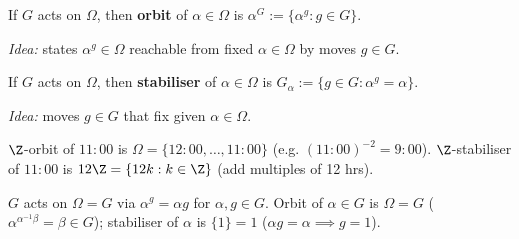 \begin{slide}
    \begin{definition}[orbit]
        \vspace{0pt}
        If $G$ acts on $\Omega$, then \textbf{orbit} of $\alpha \in \Omega$ is $\alpha^G := \{\alpha^g : g \in G\}$.
    \end{definition}

    \textit{Idea:} states $\alpha^g \in \Omega$ reachable from fixed $\alpha \in \Omega$ by moves $g \in G$. \pause

    \begin{definition}[stabiliser]
        \vspace{0pt}
        If $G$ acts on $\Omega$, then \textbf{stabiliser} of $\alpha \in \Omega$ is $G_\alpha := \{g \in G : \alpha^g = \alpha\}$.
    \end{definition}

    \textit{Idea:} moves $g \in G$ that fix given $\alpha \in \Omega$. \pause

    \begin{example}
        \vspace{0pt}
        $\Z$-orbit of $11{:}00$ is \pause $\Omega = \{12{:}00,\dotsc,11{:}00\}$ (e.g. $(11{:}00)^{-2} = 9{:}00$). $\Z$-stabiliser of $11{:}00$ is \pause $12\Z = \{12k : k \in \Z\}$ (add multiples of 12 hrs).
    \end{example} \pause

    \begin{example}
        \vspace{0pt}
        $G$ acts on $\Omega = G$ via $\alpha^g = \alpha g$ for $\alpha,g \in G$. Orbit of $\alpha \in G$ is \pause $\Omega = G$ ($\alpha^{\alpha^{-1}\beta} = \beta \in G$); stabiliser of $\alpha$ is \pause $\{1\} = 1$ ($\alpha g = \alpha \implies g = 1$).
    \end{example}
\end{slide}

